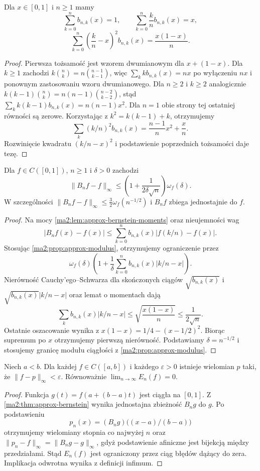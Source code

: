 \begin{lemat}
\label{ma2:lem:approx-bernstein-moments}
Dla $x\in[0,1]$ i $n\ge1$ mamy
\[
 \sum_{k=0}^n b_{n,k}(x)=1,\qquad
 \sum_{k=0}^n \frac{k}{n}b_{n,k}(x)=x,
\]
\[
 \sum_{k=0}^n
 \left(\frac{k}{n}-x\right)^2 b_{n,k}(x)
 =\frac{x(1-x)}{n}.
\]
\end{lemat}
\begin{proof}
Pierwsza tożsamość jest wzorem dwumianowym
dla $x+(1-x)$. Dla $k\ge1$ zachodzi
$k\binom nk=n\binom{n-1}{k-1}$, więc
$\sum_k k b_{n,k}(x)=nx$ po wyłączeniu $nx$
i ponownym zastosowaniu wzoru dwumianowego.
Dla $n\ge2$ i $k\ge2$ analogicznie
$k(k-1)\binom nk=n(n-1)\binom{n-2}{k-2}$,
stąd $\sum_k k(k-1)b_{n,k}(x)=n(n-1)x^2$.
Dla $n=1$ obie strony tej ostatniej równości
są zerowe. Korzystając z $k^2=k(k-1)+k$,
otrzymujemy
\[
 \sum_k (k/n)^2 b_{n,k}(x)
 =\frac{n-1}{n}x^2+\frac{x}{n}.
\]
Rozwinięcie kwadratu $(k/n-x)^2$ i podstawienie
poprzednich tożsamości daje tezę.
\end{proof}

\begin{twierdzenie}
\label{ma2:thm:approx-bernstein}
Dla $f\in C([0,1])$, $n\ge1$ i $\delta>0$
zachodzi
\[
 \|B_nf-f\|_\infty\le
 \left(1+\frac{1}{2\delta\sqrt n}\right)
 \omega_f(\delta).
\]
W szczególności
$\|B_nf-f\|_\infty\le\frac32\omega_f(n^{-1/2})$
i $B_nf$ zbiega jednostajnie do $f$.
\end{twierdzenie}
\begin{proof}
Na mocy \ref{ma2:lem:approx-bernstein-moments}
oraz nieujemności wag
\[
 |B_nf(x)-f(x)|\le
 \sum_{k=0}^n b_{n,k}(x)|f(k/n)-f(x)|.
\]
Stosując \ref{ma2:prop:approx-modulus},
otrzymujemy ograniczenie przez
\[
 \omega_f(\delta)\left(1+
 \frac1\delta\sum_{k=0}^n b_{n,k}(x)|k/n-x|\right).
\]
Nierówność Cauchy'ego--Schwarza dla skończonych
ciągów $\sqrt{b_{n,k}(x)}$ i
$\sqrt{b_{n,k}(x)}|k/n-x|$ oraz lemat o momentach
dają
\[
 \sum_k b_{n,k}(x)|k/n-x|
 \le\sqrt{\frac{x(1-x)}n}\le\frac1{2\sqrt n}.
\]
Ostatnie oszacowanie wynika z
$x(1-x)=1/4-(x-1/2)^2$.
Biorąc supremum po $x$ otrzymujemy pierwszą
nierówność. Podstawiamy $\delta=n^{-1/2}$
i stosujemy granicę modułu ciągłości z
\ref{ma2:prop:approx-modulus}.
\end{proof}

\begin{twierdzenie}
\label{ma2:thm:approx-weierstrass}
Niech $a<b$. Dla każdej $f\in C([a,b])$
i każdego $\varepsilon>0$ istnieje wielomian $p$
taki, że $\|f-p\|_\infty<\varepsilon$.
Równoważnie $\lim_{n\to\infty}E_n(f)=0$.
\end{twierdzenie}
\begin{proof}
Funkcja $g(t)=f(a+(b-a)t)$ jest ciągła na $[0,1]$.
Z \ref{ma2:thm:approx-bernstein} wynika jednostajna
zbieżność $B_ng$ do $g$. Po podstawieniu
\[
 p_n(x)=(B_ng)\bigl((x-a)/(b-a)\bigr)
\]
otrzymujemy wielomiany stopnia co najwyżej $n$
oraz $\|p_n-f\|_\infty=\|B_ng-g\|_\infty$,
gdyż podstawienie afiniczne jest bijekcją
między przedziałami. Stąd $E_n(f)$ jest
ograniczony przez ciąg błędów dążący do zera.
Implikacja odwrotna wynika z definicji infimum.
\end{proof}

